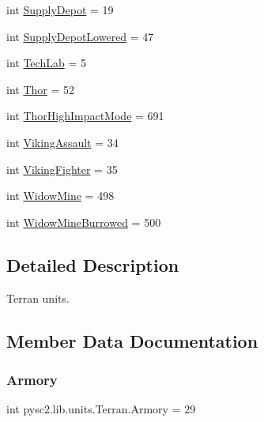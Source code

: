 \begin{DoxyCompactItemize}
int \mbox{\hyperlink{classpysc2_1_1lib_1_1units_1_1_terran_ae9b9f213c542ce7b4b3f8d53b99a3deb}{Supply\+Depot}} = 19
\item 
int \mbox{\hyperlink{classpysc2_1_1lib_1_1units_1_1_terran_ac438f57260d820f142d654e05afb0e9a}{Supply\+Depot\+Lowered}} = 47
\item 
int \mbox{\hyperlink{classpysc2_1_1lib_1_1units_1_1_terran_acd3541a4f57329f4a09690a69528d1f2}{Tech\+Lab}} = 5
\item 
int \mbox{\hyperlink{classpysc2_1_1lib_1_1units_1_1_terran_a98605fec91c514cab6e057768dd05c17}{Thor}} = 52
\item 
int \mbox{\hyperlink{classpysc2_1_1lib_1_1units_1_1_terran_a335d04040e16641e6a4901378eb68bdf}{Thor\+High\+Impact\+Mode}} = 691
\item 
int \mbox{\hyperlink{classpysc2_1_1lib_1_1units_1_1_terran_a52a4fd50145ea56f4ac5d49ce3f10031}{Viking\+Assault}} = 34
\item 
int \mbox{\hyperlink{classpysc2_1_1lib_1_1units_1_1_terran_ae1eb9f0f4e79617ecfcb687a5fe823b3}{Viking\+Fighter}} = 35
\item 
int \mbox{\hyperlink{classpysc2_1_1lib_1_1units_1_1_terran_a463d2f5661de81d58309c6ed888bfcb2}{Widow\+Mine}} = 498
\item 
int \mbox{\hyperlink{classpysc2_1_1lib_1_1units_1_1_terran_a650e5fc97428591198f2f69644c44363}{Widow\+Mine\+Burrowed}} = 500
\end{DoxyCompactItemize}


\subsection{Detailed Description}
\begin{DoxyVerb}Terran units.\end{DoxyVerb}
 

\subsection{Member Data Documentation}
\mbox{\label{classpysc2_1_1lib_1_1units_1_1_terran_aee04002a98d46a17aeb4b46e5996cd74}} 
\subsubsection{\texorpdfstring{Armory}{Armory}}
{\footnotesize\ttfamily int pysc2.\+lib.\+units.\+Terran.\+Armory = 29\hspace{0.3cm}{\ttfamily [static]}}

